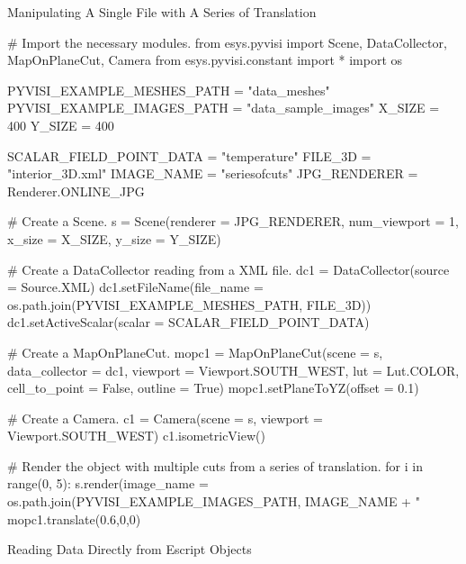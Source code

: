 \textsf{Manipulating A Single File with A Series of Translation}

\begin{python}
# Import the necessary modules.
from esys.pyvisi import Scene, DataCollector, MapOnPlaneCut, Camera
from esys.pyvisi.constant import *
import os

PYVISI_EXAMPLE_MESHES_PATH = "data_meshes"
PYVISI_EXAMPLE_IMAGES_PATH = "data_sample_images"
X_SIZE = 400
Y_SIZE = 400

SCALAR_FIELD_POINT_DATA = "temperature"
FILE_3D = "interior_3D.xml"
IMAGE_NAME = "seriesofcuts"
JPG_RENDERER = Renderer.ONLINE_JPG

# Create a Scene.
s = Scene(renderer = JPG_RENDERER, num_viewport = 1, x_size = X_SIZE, 
        y_size = Y_SIZE)

# Create a DataCollector reading from a XML file.
dc1 = DataCollector(source = Source.XML)
dc1.setFileName(file_name = os.path.join(PYVISI_EXAMPLE_MESHES_PATH, FILE_3D))
dc1.setActiveScalar(scalar = SCALAR_FIELD_POINT_DATA)

# Create a MapOnPlaneCut.
mopc1 = MapOnPlaneCut(scene = s, data_collector = dc1, 
        viewport = Viewport.SOUTH_WEST, lut = Lut.COLOR, cell_to_point = False,
        outline = True)
mopc1.setPlaneToYZ(offset = 0.1)

# Create a Camera.
c1 = Camera(scene = s, viewport = Viewport.SOUTH_WEST)
c1.isometricView()

# Render the object with multiple cuts from a series of translation.
for i in range(0, 5):
    s.render(image_name = os.path.join(PYVISI_EXAMPLE_IMAGES_PATH, IMAGE_NAME +
			"%
    mopc1.translate(0.6,0,0)
\end{python}

\textsf{Reading Data Directly from Escript Objects}

